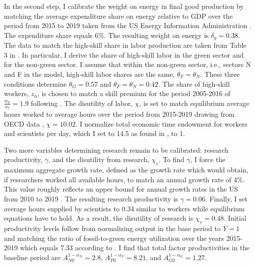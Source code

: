 In the second step, I calibrate the weight on energy in final good production by matching the average expenditure share on energy relative to GDP over the period from 2015 to 2019 taken from the US Energy Information Administration \citep[][Table 1.7]{EIAEnergy}. The expenditure share equals 6\%. The resulting weight on energy is $\delta_y=0.38$. %
 The data to match the high-skill share in labor production are taken from Table 3 in \cite{Consoli2016DoCapital}. In particular, I derive the share of high-skill labor in the green sector and for the non-green sector. I assume that within the non-green sector, i.e., sectors N and F in the model, high-skill labor shares are the same, $\theta_F=\theta_N$.  These three conditions determine $\theta_G=0.57$ and $\theta_F=\theta_N=0.42$. The share of high-skill workers, $z_h$, is chosen to match a skill premium for the period 2005-2016 of $\frac{w_h}{w_l}=1.9$ following \cite{Slavik2020WagePremium}. The disutility of labor, $\chi$, is set to match equilibrium average hours worked to average hours over the period from 2015-2019 drawing from OECD data \citep{OECDHoursworked}, $\chi=10.02$. I normalize total economic time endowment for workers and scientists per day, which I set to 14.5 as found in \cite{Jones1993OptimalGrowth}, to 1. 

 Two more variables determining research remain to be calibrated: research productivity, $\gamma$, and the disutility from research, $\chi_s$.
 To find $\gamma$, I force the maximum aggregate growth rate, defined as the growth rate which would obtain, if researchers worked all available hours, to match an annual growth rate of $4\%$. This value roughly reflects an upper bound for annual growth rates in the US from 2010 to 2019 \citep[compare][]{OECDGDP}.
  The resulting research productivity is $\gamma = 0.06$.  Finally, I set average hours supplied by scientists to 0.34 similar to workers while equilibrium equations have to hold. As a result, the disutility of research is $\chi_s=0.48$. Initial productivity levels follow from normalizing output in the base period to $Y=1$ and matching the ratio of fossil-to-green energy utilization over the years 2015-2019 which equals 7.33 according to \cite[][Table 1.3]{EIAEnergy}. I find that total factor productivities in the baseline period are $A_{N0}^{1-\alpha_N}=2.8$, $A_{F0}^{1-\alpha_F}=8.21$, and $A_{G0}^{1-\alpha_G}=1.27$. %

